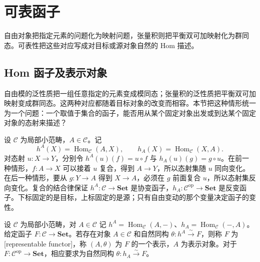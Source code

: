 
\section{可表函子}
\label{b4:sec:0301}

自由对象把指定元素的问题化为映射问题，张量积则把平衡双可加映射化为群同态。可表性把这些对应写成对目标或源对象自然的 Hom 描述。


%
%

\subsection{Hom 函子及表示对象}
\label{b4:subsec:0301:01}

自由模的泛性质把一组任意指定的元素变成模同态；张量积的泛性质把平衡双可加映射变成群同态。这两种对应都随着目标对象的改变而相容。本节把这种情形统一为一个问题：一个取值于集合的函子，能否用从某个固定对象出发或到达某个固定对象的态射来描述？

\ProseParagraphBreak
设 \(\mathcal C\) 为局部小范畴，\(A\in\mathcal C\)。记
\[
	h^A(X)=\operatorname{Hom}_{\mathcal C}(A,X),\qquad h_A(X)=\operatorname{Hom}_{\mathcal C}(X,A).
\]
对态射 \(u:X\rightarrow Y\)，分别令 \(h^A(u)(f)=u\circ f\) 与 \(h_A(u)(g)=g\circ u\)。在前一种情形，\(f:A\rightarrow X\) 可以接着 \(u\) 复合，得到 \(A\rightarrow Y\)，所以态射集随 \(u\) 同向变化。在后一种情形，要从 \(g:Y\rightarrow A\) 得到 \(X\rightarrow A\)，必须在 \(g\) 前面复合 \(u\)，所以态射集反向变化。复合的结合律保证 \(h^A:\mathcal C\rightarrow\mathbf{Set}\) 是协变函子，\(h_A:\mathcal C^{\mathrm{op}}\rightarrow\mathbf{Set}\) 是反变函子。下标固定的是目标，上标固定的是源；只有自由变动的那个变量决定函子的变性。

\begin{definition}\label{b4:def:representable-functor}
	设 \(\mathcal C\) 为局部小范畴，对 \(A\in\mathcal C\) 记 \(h^A=\operatorname{Hom}_{\mathcal C}(A,-)\)、\(h_A=\operatorname{Hom}_{\mathcal C}(-,A)\)。给定函子 \(F:\mathcal C\rightarrow\mathbf{Set}\)。若存在对象 \(A\in\mathcal C\) 和自然同构 \(\theta:h^A\xrightarrow{\sim}F\)，则称 \(F\) 为[representable functor]，称 \((A,\theta)\) 为 \(F\) 的一个表示，\(A\) 为表示对象。对于 \(F:\mathcal C^{\mathrm{op}}\rightarrow\mathbf{Set}\)，相应要求为自然同构 \(\theta:h_A\xrightarrow{\sim}F\)。
\end{definition}

